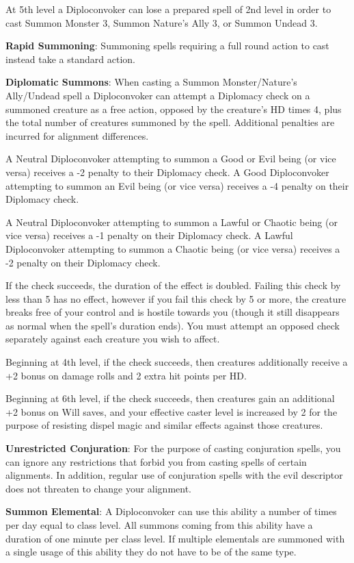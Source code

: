 At 5th level a Diploconvoker can lose a prepared spell of 2nd level in order to cast Summon Monster 3, Summon Nature’s Ally 3, or Summon Undead 3. 

\textbf{Rapid Summoning}: Summoning spells requiring a full round action to cast instead take a standard action.

\textbf{Diplomatic Summons}: When casting a Summon Monster/Nature’s Ally/Undead spell a Diploconvoker can attempt a Diplomacy check on a summoned creature as a free action, opposed by the creature’s HD times 4, plus the total number of creatures summoned by the spell. 
Additional penalties are incurred for alignment differences. 

A Neutral Diploconvoker attempting to summon a Good or Evil being (or vice versa) receives a -2 penalty to their Diplomacy check. A Good Diploconvoker attempting to summon an Evil being (or vice versa) receives a -4 penalty on their Diplomacy check.

A Neutral Diploconvoker attempting to summon a Lawful or Chaotic being (or vice versa) receives a -1 penalty on their Diplomacy check. A Lawful Diploconvoker attempting to summon a Chaotic being (or vice versa) receives a -2 penalty on their Diplomacy check.

If the check succeeds, the duration of the effect is doubled. Failing this check by less than 5 has no effect, however if you fail this check by 5 or more, the creature breaks free of your control and is hostile towards you (though it still disappears as normal when the spell’s duration ends). You must attempt an opposed check separately against each creature you wish to affect.

Beginning at 4th level, if the check succeeds, then creatures additionally receive a +2 bonus on damage rolls and 2 extra hit points per HD.

Beginning at 6th level, if the check succeeds, then creatures gain an additional +2 bonus on Will saves, and your effective caster level is increased by 2 for the purpose of resisting dispel magic and similar effects against those creatures.

\textbf{Unrestricted Conjuration}: For the purpose of casting conjuration spells, you can ignore any restrictions that forbid you from casting spells of certain alignments. In addition, regular use of conjuration spells with the evil descriptor does not threaten to change your alignment.

\textbf{Summon Elemental}: A Diploconvoker can use this ability a number of times per day equal to class level. All summons coming from this ability have a duration of one minute per class level. If multiple elementals are summoned with a single usage of this ability they do not have to be of the same type.

